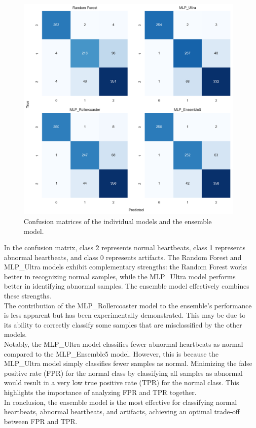 \begin{figure}[H]
    \centering
    \includegraphics[width=1\columnwidth]{./images/confmat_ensemble_vs_individual.png}
    \caption{Confusion matrices of the individual models and the ensemble model.}
    \label{fig:confmat_ensemble_vs_individual}
\end{figure}

\noindent
In the confusion matrix, class 2 represents normal heartbeats, class 1 represents abnormal heartbeats, and 
class 0 represents artifacts. The Random Forest and MLP\_Ultra models exhibit complementary strengths: the 
Random Forest works better in recognizing normal samples, while the MLP\_Ultra model performs better in 
identifying abnormal samples. The ensemble model effectively combines these strengths.\\\noindent
The contribution of the MLP\_Rollercoaster model to the ensemble’s performance is less apparent but has been 
experimentally demonstrated. This may be due to its ability to correctly classify some samples that are 
misclassified by the other models.\\\noindent
Notably, the MLP\_Ultra model classifies fewer abnormal heartbeats as normal compared to the MLP\_Ensemble5 
model. However, this is because the MLP\_Ultra model simply classifies fewer samples as normal. Minimizing 
the false positive rate (FPR) for the normal class by classifying all samples as abnormal would result in a very 
low true positive rate (TPR) for the normal class. This highlights the importance of analyzing FPR and TPR together.\\\noindent
In conclusion, the ensemble model is the most effective for classifying normal heartbeats, abnormal heartbeats, 
and artifacts, achieving an optimal trade-off between FPR and TPR.